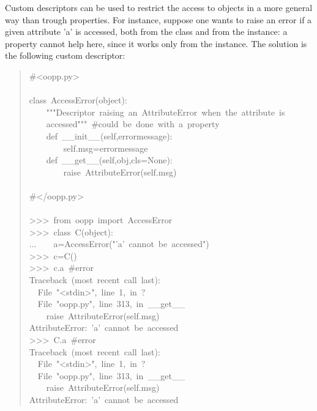 \documentclass[10pt,english]{article}
\begin{document}
Custom descriptors can be used to restrict the access to objects in a
more general way than trough properties. For instance, suppose one
wants to raise an error if a given attribute 'a' is accessed, both
from the class and from the instance: a property cannot help here,
since it works only from the instance. The solution is the following
custom descriptor:
\begin{quote}
\begin{ttfamily}\begin{flushleft}
\mbox{{\#}<oopp.py>}\\
\mbox{}\\
\mbox{class~AccessError(object):}\\
\mbox{~~~~"""Descriptor~raising~an~AttributeError~when~the~attribute~is~}\\
\mbox{~~~~accessed"""~{\#}could~be~done~with~a~property}\\
\mbox{~~~~def~{\_}{\_}init{\_}{\_}(self,errormessage):}\\
\mbox{~~~~~~~~self.msg=errormessage}\\
\mbox{~~~~def~{\_}{\_}get{\_}{\_}(self,obj,cls=None):}\\
\mbox{~~~~~~~~raise~AttributeError(self.msg)}\\
\mbox{}\\
\mbox{{\#}</oopp.py>}\\
\mbox{}\\
\mbox{>>>~from~oopp~import~AccessError}\\
\mbox{>>>~class~C(object):}\\
\mbox{...~~~~a=AccessError("'a'~cannot~be~accessed")}\\
\mbox{>>>~c=C()}\\
\mbox{>>>~c.a~{\#}error}\\
\mbox{Traceback~(most~recent~call~last):}\\
\mbox{~~File~"<stdin>",~line~1,~in~?}\\
\mbox{~~File~"oopp.py",~line~313,~in~{\_}{\_}get{\_}{\_}}\\
\mbox{~~~~raise~AttributeError(self.msg)}\\
\mbox{AttributeError:~'a'~cannot~be~accessed}\\
\mbox{>>>~C.a~{\#}error}\\
\mbox{Traceback~(most~recent~call~last):}\\
\mbox{~~File~"<stdin>",~line~1,~in~?}\\
\mbox{~~File~"oopp.py",~line~313,~in~{\_}{\_}get{\_}{\_}}\\
\mbox{~~~~raise~AttributeError(self.msg)}\\
\mbox{AttributeError:~'a'~cannot~be~accessed}
\end{flushleft}\end{ttfamily}
\end{quote}
\end{document}
